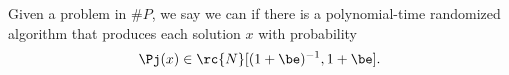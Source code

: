 \begin{df}
Given a problem in $\#P$, we say we can  if there is a polynomial-time randomized algorithm that produces each solution $x$ with probability
\[\Pj(x)\in \rc{N}[(1+\be)^{-1},1+\be].
\]
\end{df}